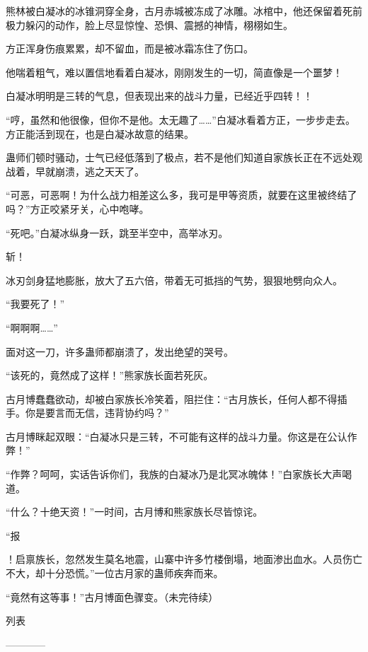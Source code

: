\begin{this_body}
熊林被白凝冰的冰锥洞穿全身，古月赤城被冻成了冰雕。冰棺中，他还保留着死前极力躲闪的动作，脸上尽显惊惶、恐惧、震撼的神情，栩栩如生。

方正浑身伤痕累累，却不留血，而是被冰霜冻住了伤口。

他喘着粗气，难以置信地看着白凝冰，刚刚发生的一切，简直像是一个噩梦！

白凝冰明明是三转的气息，但表现出来的战斗力量，已经近乎四转！！

“哼，虽然和他很像，但你不是他。太无趣了……”白凝冰看着方正，一步步走去。方正能活到现在，也是白凝冰故意的结果。

蛊师们顿时骚动，士气已经低落到了极点，若不是他们知道自家族长正在不远处观战着，早就崩溃，逃之天天了。

“可恶，可恶啊！为什么战力相差这么多，我可是甲等资质，就要在这里被终结了吗？”方正咬紧牙关，心中咆哮。

“死吧。”白凝冰纵身一跃，跳至半空中，高举冰刃。

斩！

冰刃剑身猛地膨胀，放大了五六倍，带着无可抵挡的气势，狠狠地劈向众人。

“我要死了！”

“啊啊啊……”

面对这一刀，许多蛊师都崩溃了，发出绝望的哭号。

“该死的，竟然成了这样！”熊家族长面若死灰。

古月博蠢蠢欲动，却被白家族长冷笑着，阻拦住：“古月族长，任何人都不得插手。你是要言而无信，违背协约吗？”

古月博眯起双眼：“白凝冰只是三转，不可能有这样的战斗力量。你这是在公认作弊！”

“作弊？呵呵，实话告诉你们，我族的白凝冰乃是北冥冰魄体！”白家族长大声喝道。

“什么？十绝天资！”一时间，古月博和熊家族长尽皆惊诧。

“报

！启禀族长，忽然发生莫名地震，山寨中许多竹楼倒塌，地面渗出血水。人员伤亡不大，却十分恐慌。”一位古月家的蛊师疾奔而来。

“竟然有这等事！”古月博面色骤变。（未完待续）

列表

------------

\end{this_body}

